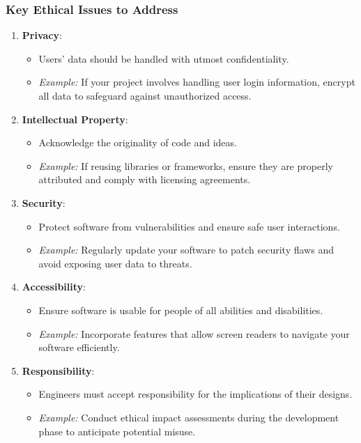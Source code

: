 \documentclass{beamer}
\begin{document}
\begin{frame}[fragile]
    \frametitle{Key Ethical Issues to Address}
    \begin{enumerate}
        \item \textbf{Privacy}:
        \begin{itemize}
            \item Users' data should be handled with utmost confidentiality.
            \item \textit{Example:} If your project involves handling user login information, encrypt all data to safeguard against unauthorized access.
        \end{itemize}

        \item \textbf{Intellectual Property}:
        \begin{itemize}
            \item Acknowledge the originality of code and ideas.
            \item \textit{Example:} If reusing libraries or frameworks, ensure they are properly attributed and comply with licensing agreements.
        \end{itemize}
        
        \item \textbf{Security}:
        \begin{itemize}
            \item Protect software from vulnerabilities and ensure safe user interactions.
            \item \textit{Example:} Regularly update your software to patch security flaws and avoid exposing user data to threats.
        \end{itemize}
        
        \item \textbf{Accessibility}:
        \begin{itemize}
            \item Ensure software is usable for people of all abilities and disabilities.
            \item \textit{Example:} Incorporate features that allow screen readers to navigate your software efficiently.
        \end{itemize}
        
        \item \textbf{Responsibility}:
        \begin{itemize}
            \item Engineers must accept responsibility for the implications of their designs.
            \item \textit{Example:} Conduct ethical impact assessments during the development phase to anticipate potential misuse.
        \end{itemize}
    \end{enumerate}
\end{frame}
\end{document}

